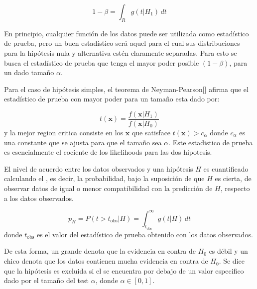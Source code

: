 \begin{equation}
1-\beta = \int_R g(t|H_1)\, dt
\end{equation}

En principio, cualquier función de los datos puede ser utilizada como estadístico
de prueba, pero un buen estadístico será aquel para el cual sus distribuciones
para la hipótesis nula y alternativa estén claramente separadas. Para esto se
busca el estadístico de prueba que tenga el mayor poder posible $(1-\beta)$, para un dado
tama\~no $\alpha$.

Para el caso de hipótesis simples, el teorema de Neyman-Pearson[] afirma que el
estadístico de prueba con mayor poder para un tama\~no esta dado por:


\begin{equation}
  t(\bm{x}) = \frac{f(\bm{x}|H_1)}{f(\bm{x}|H_0)}
\end{equation}
%
y la mejor region critica consiste en los $\bm{x}$ que satisface $t(\bm{x}) > c_\alpha$
donde $c_\alpha$ es una constante que se ajusta para que el tama\~no sea $\alpha$.
Este estadistico de prueba es esencialmente el cociente de los likelihoods
para las dos hipotesis.


El nivel de acuerdo entre los datos observados y una hipótesis $H$ es
cuantificado calculando el \emph{\pvalue}, es decir, la probabilidad, bajo la
suposición de que $H$ es cierta, de observar datos de igual o menor
compatibilidad con la predicción de $H$, respecto a los datos observados.

\begin{equation}
  p_H = P(t>t_\text{obs}|H) = \int_{t_\text{obs}}^{\infty} g(t|H) \, dt
\end{equation}
%
donde $t_\text{obs}$ es el valor del estadístico de prueba obtenido con los
datos observados.

De esta forma, un {\pvalue} grande denota que la evidencia en contra de $H_0$ es
débil y un {\pvalue} chico denota que los datos contienen mucha evidencia en
contra de $H_0$.
Se dice que la hipótesis es excluida si el {\pvalue} se encuentra por debajo de un valor
especifico dado por el tama\~no del test $\alpha$, donde $\alpha \in [0,1]$.

